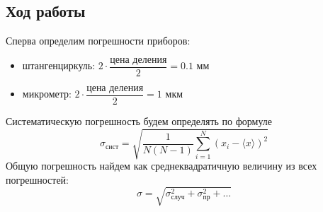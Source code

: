 \documentclass[a4paper,12pt]{article}
\begin{document}
	\subsection*{Ход работы}
	Сперва определим погрешности приборов:
	\begin{itemize}
		\item штангенциркуль: $2\cdot\dfrac{\text{цена деления}}{2} = 0.1$ мм
		\item микрометр: $2\cdot\dfrac{\text{цена деления}}{2} = 1$ мкм
	\end{itemize}
	Систематическую погрешность будем определять по формуле
	$$
	\sigma_{\text{сист}} = \sqrt{\frac{1}{N(N - 1)}\sum_{i = 1}^{N}(x_i - \langle x\rangle)^2}
	$$
	Общую погрешность найдем как среднеквадратичную величину из всех погрешностей:
	$$
	\sigma = \sqrt{\sigma^2_{\text{случ}} + \sigma^2_{\text{пр}} + \dots}
	$$
\end{document}
